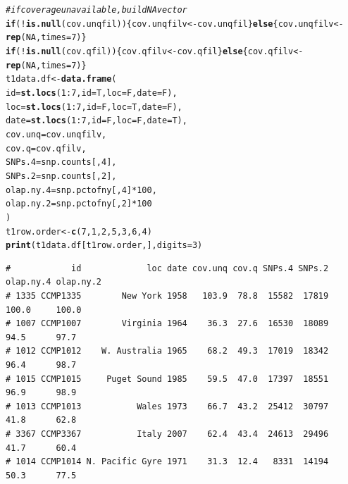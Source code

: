 \documentclass{article}\usepackage[]{graphicx}\usepackage[]{color}
\makeatletter
\newcommand{\hlnum}[1]{\textcolor[rgb]{0.686,0.059,0.569}{#1}}%
\newcommand{\hlcom}[1]{\textcolor[rgb]{0.678,0.584,0.686}{\textit{#1}}}%
\newcommand{\hlopt}[1]{\textcolor[rgb]{0,0,0}{#1}}%
\newcommand{\hlstd}[1]{\textcolor[rgb]{0.345,0.345,0.345}{#1}}%
\newcommand{\hlkwa}[1]{\textcolor[rgb]{0.161,0.373,0.58}{\textbf{#1}}}%
\newcommand{\hlkwb}[1]{\textcolor[rgb]{0.69,0.353,0.396}{#1}}%
\newcommand{\hlkwc}[1]{\textcolor[rgb]{0.333,0.667,0.333}{#1}}%
\newcommand{\hlkwd}[1]{\textcolor[rgb]{0.737,0.353,0.396}{\textbf{#1}}}%
\newenvironment{kframe}{%
 \def\at@end@of@kframe{}%
 \ifinner\ifhmode%
  \def\at@end@of@kframe{\end{minipage}}%
  \begin{minipage}{\columnwidth}%
 \fi\fi%
 \def\FrameCommand##1{\hskip\@totalleftmargin \hskip-\fboxsep
 \colorbox{shadecolor}{##1}\hskip-\fboxsep
     \hskip-\linewidth \hskip-\@totalleftmargin \hskip\columnwidth}%
 \MakeFramed {\advance\hsize-\width
   \@totalleftmargin\z@ \linewidth\hsize
   \@setminipage}}%
 {\par\unskip\endMakeFramed%
 \at@end@of@kframe}
\newenvironment{knitrout}{}{} %
\makeatother
\begin{document}
\begin{knitrout}\footnotesize
{}\color{fgcolor}\begin{kframe}
\begin{alltt}
\hlcom{# if coverage unavailable, build NA vector}
\hlkwa{if}\hlstd{(}\hlopt{!}\hlkwd{is.null}\hlstd{(cov.unqfil))\{cov.unqfilv} \hlkwb{<-} \hlstd{cov.unqfil\}} \hlkwa{else} \hlstd{\{cov.unqfilv} \hlkwb{<-} \hlkwd{rep}\hlstd{(}\hlnum{NA}\hlstd{,}\hlkwc{times}\hlstd{=}\hlnum{7}\hlstd{)\}}
\hlkwa{if}\hlstd{(}\hlopt{!}\hlkwd{is.null}\hlstd{(cov.qfil  ))\{cov.qfilv}   \hlkwb{<-} \hlstd{cov.qfil  \}} \hlkwa{else} \hlstd{\{cov.qfilv}   \hlkwb{<-} \hlkwd{rep}\hlstd{(}\hlnum{NA}\hlstd{,}\hlkwc{times}\hlstd{=}\hlnum{7}\hlstd{)\}}
\hlstd{t1data.df} \hlkwb{<-} \hlkwd{data.frame}\hlstd{(}
  \hlkwc{id}        \hlstd{=} \hlkwd{st.locs}\hlstd{(}\hlnum{1}\hlopt{:}\hlnum{7}\hlstd{,} \hlkwc{id}\hlstd{=T,} \hlkwc{loc}\hlstd{=F,} \hlkwc{date}\hlstd{=F),}
  \hlkwc{loc}       \hlstd{=} \hlkwd{st.locs}\hlstd{(}\hlnum{1}\hlopt{:}\hlnum{7}\hlstd{,} \hlkwc{id}\hlstd{=F,} \hlkwc{loc}\hlstd{=T,} \hlkwc{date}\hlstd{=F),}
  \hlkwc{date}      \hlstd{=} \hlkwd{st.locs}\hlstd{(}\hlnum{1}\hlopt{:}\hlnum{7}\hlstd{,} \hlkwc{id}\hlstd{=F,} \hlkwc{loc}\hlstd{=F,} \hlkwc{date}\hlstd{=T),}
  \hlkwc{cov.unq}   \hlstd{= cov.unqfilv,}
  \hlkwc{cov.q}     \hlstd{= cov.qfilv,}
  \hlkwc{SNPs.4}    \hlstd{= snp.counts[,}\hlnum{4}\hlstd{],}
  \hlkwc{SNPs.2}    \hlstd{= snp.counts[,}\hlnum{2}\hlstd{],}
  \hlkwc{olap.ny.4} \hlstd{= snp.pctofny[,}\hlnum{4}\hlstd{]}\hlopt{*}\hlnum{100}\hlstd{,}
  \hlkwc{olap.ny.2} \hlstd{= snp.pctofny[,}\hlnum{2}\hlstd{]}\hlopt{*}\hlnum{100}
\hlstd{)}
\hlstd{t1row.order} \hlkwb{<-} \hlkwd{c}\hlstd{(}\hlnum{7}\hlstd{,}\hlnum{1}\hlstd{,}\hlnum{2}\hlstd{,}\hlnum{5}\hlstd{,}\hlnum{3}\hlstd{,}\hlnum{6}\hlstd{,}\hlnum{4}\hlstd{)}
\hlkwd{print}\hlstd{(t1data.df[t1row.order,],}\hlkwc{digits}\hlstd{=}\hlnum{3}\hlstd{)}
\end{alltt}
\begin{verbatim}
#            id             loc date cov.unq cov.q SNPs.4 SNPs.2 olap.ny.4 olap.ny.2
# 1335 CCMP1335        New York 1958   103.9  78.8  15582  17819     100.0     100.0
# 1007 CCMP1007        Virginia 1964    36.3  27.6  16530  18089      94.5      97.7
# 1012 CCMP1012    W. Australia 1965    68.2  49.3  17019  18342      96.4      98.7
# 1015 CCMP1015     Puget Sound 1985    59.5  47.0  17397  18551      96.9      98.9
# 1013 CCMP1013           Wales 1973    66.7  43.2  25412  30797      41.8      62.8
# 3367 CCMP3367           Italy 2007    62.4  43.4  24613  29496      41.7      60.4
# 1014 CCMP1014 N. Pacific Gyre 1971    31.3  12.4   8331  14194      50.3      77.5
\end{verbatim}
\end{kframe}
\end{knitrout}
\end{document}
